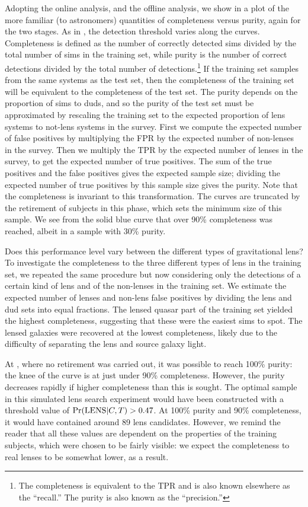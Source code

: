 \documentclass[useAMS,usenatbib,a4paper]{mn2e}
\begin{document}
Adopting the online \StageOne analysis, and the offline \StageTwo analysis, we
show in  a plot of the more familiar (to
astronomers) quantities of completeness versus purity, again for
the two stages. As in , the detection threshold
varies along the curves. Completeness is defined as the number of correctly
detected sims divided by the total number of sims in the training set, while
purity is the number of correct detections divided by the total number of
detections.\footnote{The completeness is equivalent to the TPR and is also
known elsewhere as the ``recall.''  The purity is also known as the
``precision.''} If the training set samples from the same systems as the test
set, then the completeness of the training set will be equivalent to the
completeness of the test set. The purity depends on the proportion of sims to
duds, and so the purity of the test set must be approximated by rescaling the
training set to the expected proportion of lens systems to not-lens systems in
the survey. First we compute the expected number of false positives by
multiplying the FPR by the expected number of non-lenses in the survey. Then
we multiply the TPR by the expected number of lenses in the survey, to get the
expected number of true positives. The sum of the true positives and the false
positives gives the expected sample size; dividing the expected number of true
positives by this sample size gives the purity. Note that the completeness is
invariant to this transformation.
The \StageOne curves are truncated by the retirement of subjects in this phase,
which sets the minimum size of this sample. We see from the solid blue curve
that over 90\% completeness was reached, albeit in a sample with 30\%
purity.

Does this performance level vary between the different types of gravitational
lens? To investigate the completeness to the three different types of lens in
the training set, we repeated the same procedure but now considering only the
detections of a certain kind of lens and of the non-lenses in the training set.
We estimate the expected number of lenses and non-lens false positives by
dividing the lens and dud sets into equal fractions. The lensed quasar part of
the training set yielded the highest completeness, suggesting that these were
the easiest sims to spot. The lensed galaxies were recovered at the lowest
completeness, likely due to the difficulty  of separating the lens and source
galaxy light.

At \StageTwo, where no retirement was carried out, it was possible to reach
100\% purity: the knee of the curve is at just under 90\% completeness. However,
the purity decreases rapidly if higher completeness than this is sought. The
optimal sample in this simulated lens search experiment would have been
constructed with a threshold value of ${\rm Pr}({\rm LENS}|C,T) > 0.47$. At 100\% purity
and 90\% completeness, it would have contained around 89 lens candidates.
However, we remind the reader that all these values are dependent on the
properties of the training subjects, which were chosen to be fairly
visible: we expect the completeness to real lenses to be somewhat lower, as a
result.
\end{document}
